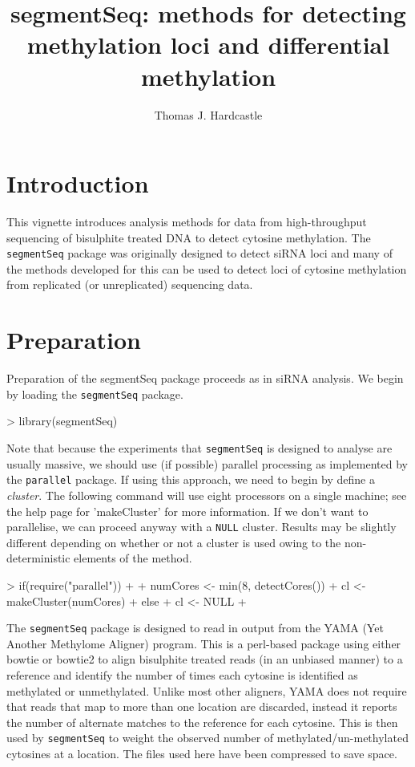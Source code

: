 \documentclass[a4paper]{article}
\title{segmentSeq: methods for detecting methylation loci and differential methylation}
\author{Thomas J. Hardcastle}
\begin{document}
\maketitle

\section{Introduction}

This vignette introduces analysis methods for data from high-throughput sequencing of bisulphite treated DNA to detect cytosine methylation. The \verb'segmentSeq' package was originally designed to detect siRNA loci \cite{Hardcastle:2011} and many of the methods developed for this can be used to detect loci of cytosine methylation from replicated (or unreplicated) sequencing data.

\section{Preparation}

Preparation of the segmentSeq package proceeds as in siRNA analysis. We begin by loading the \verb'segmentSeq' package.

\begin{Schunk}
\begin{Sinput}
>   library(segmentSeq)
\end{Sinput}
\end{Schunk}

Note that because the experiments that \verb'segmentSeq' is designed to analyse are usually massive, we should use (if possible) parallel processing as implemented by the \verb'parallel' package. If using this approach, we need to begin by define a \textsl{cluster}. The following command will use eight processors on a single machine; see the help page for 'makeCluster' for more information. If we don't want to parallelise, we can proceed anyway with a \verb'NULL' cluster. Results may be slightly different depending on whether or not a cluster is used owing to the non-deterministic elements of the method.

\begin{Schunk}
\begin{Sinput}
> if(require("parallel")) 
+ {
+     numCores <- min(8, detectCores())
+     cl <- makeCluster(numCores)
+ } else {
+     cl <- NULL
+ }
\end{Sinput}
\end{Schunk}


The \verb'segmentSeq' package is designed to read in output from the YAMA (Yet Another Methylome Aligner) program. This is a perl-based package using either bowtie or bowtie2 to align bisulphite treated reads (in an unbiased manner) to a reference and identify the number of times each cytosine is identified as methylated or unmethylated. Unlike most other aligners, YAMA does not require that reads that map to more than one location are discarded, instead it reports the number of alternate matches to the reference for each cytosine. This is then used by \verb'segmentSeq' to weight the observed number of methylated/un-methylated cytosines at a location. The files used here have been compressed to save space.
\end{document}
